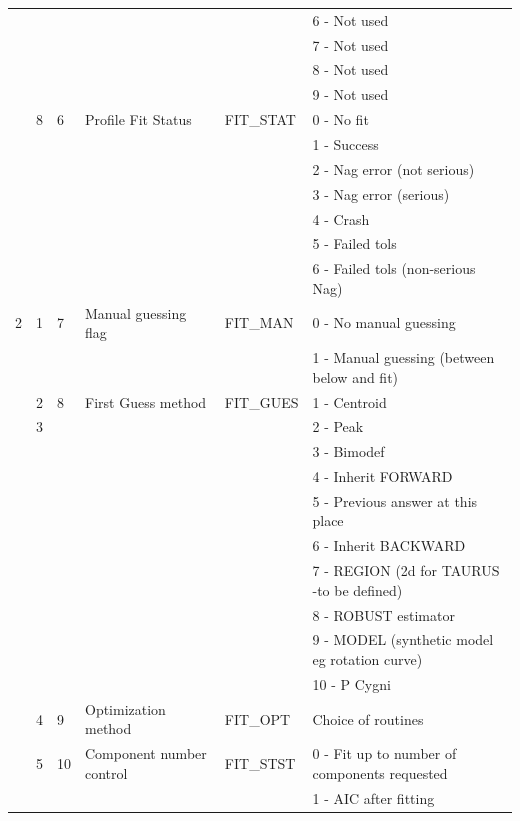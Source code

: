 \documentclass[11pt,twoside]{article}
\newenvironment{latexonly}{}{}
\begin{document}
\begin{latexonly}
\begin{table}
\begin{center}
\begin{tabular}{|l|l|l|l|l|l|}
  &   &   & & & 6 - Not used\\
  &   &   & & & 7 - Not used\\
  &   &   & & & 8 - Not used\\
  &   &   & & & 9 - Not used\\ \cline{2-6}
  & 8 & 6 & Profile Fit Status & FIT\_STAT & 0 - No fit \\
  &   &   &                    & & 1 - Success \\
  &   &   &                    & & 2 - Nag error (not serious)\\
  &   &   &                    & & 3 - Nag error (serious)\\
  &   &   &                    & & 4 - Crash \\
  &   &   &                    & & 5 - Failed tols\\
  &   &   &                & & 6 - Failed tols (non-serious Nag)\\ \hline
2 & 1 & 7 & Manual guessing flag & FIT\_MAN & 0 - No manual guessing\\
  &   &   & & &  1 - Manual guessing (between below and fit)\\ \cline{2-6}
  & 2 & 8 & First Guess method & FIT\_GUES & 1 - Centroid \\
  & 3 &   &                    & &  2 - Peak\\
  &   &   &                    & &  3 - Bimodef\\
  &   &   &                    & &  4 - Inherit FORWARD\\
  &   &   &                    & &  5 - Previous answer at this place\\
  &   &   &                    & &  6 - Inherit BACKWARD\\
  &   &   &              & &  7 - REGION (2d for TAURUS -to be defined)\\
  &   &   &                    & &  8 - ROBUST estimator\\
  &   &   &                    & &  9 - MODEL (synthetic model eg
rotation curve)\\
  &   &   &                    & &  10 - P Cygni\\ \cline{2-6}
  & 4 & 9 & Optimization method & FIT\_OPT & Choice of routines\\ \cline{2-6}
  & 5 & 10 & Component number control & FIT\_STST &
                       0 - Fit up to number of components requested\\
  &   &   &  & &         1 - AIC after fitting\\

\end{tabular}
\end{center}
\end{table}
\end{latexonly}
\end{document}
